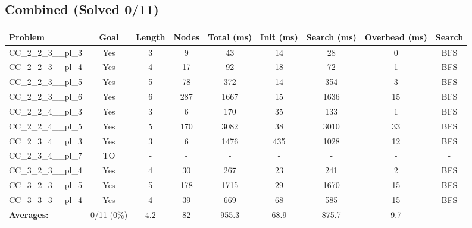 \documentclass{article}
\begin{document}
\subsection*{Combined (Solved 0/11)}
\begin{tabular}{lcccccccc}
\toprule
Problem & Goal & Length & Nodes & Total (ms) & Init (ms) & Search (ms) & Overhead (ms) & Search \\
\midrule
CC\_2\_2\_3\_\_pl\_3 & Yes & 3 & 9 & 43 & 14 & 28 & 0 & BFS \\
CC\_2\_2\_3\_\_pl\_4 & Yes & 4 & 17 & 92 & 18 & 72 & 1 & BFS \\
CC\_2\_2\_3\_\_pl\_5 & Yes & 5 & 78 & 372 & 14 & 354 & 3 & BFS \\
CC\_2\_2\_3\_\_pl\_6 & Yes & 6 & 287 & 1667 & 15 & 1636 & 15 & BFS \\
CC\_2\_2\_4\_\_pl\_3 & Yes & 3 & 6 & 170 & 35 & 133 & 1 & BFS \\
CC\_2\_2\_4\_\_pl\_5 & Yes & 5 & 170 & 3082 & 38 & 3010 & 33 & BFS \\
CC\_2\_3\_4\_\_pl\_3 & Yes & 3 & 6 & 1476 & 435 & 1028 & 12 & BFS \\
CC\_2\_3\_4\_\_pl\_7 & TO & - & - & - & - & - & - & - \\
CC\_3\_2\_3\_\_pl\_4 & Yes & 4 & 30 & 267 & 23 & 241 & 2 & BFS \\
CC\_3\_2\_3\_\_pl\_5 & Yes & 5 & 178 & 1715 & 29 & 1670 & 15 & BFS \\
CC\_3\_3\_3\_\_pl\_4 & Yes & 4 & 39 & 669 & 68 & 585 & 15 & BFS \\
\textbf{Averages:} & 0/11 (0\%) & 4.2 & 82 & 955.3 & 68.9 & 875.7 & 9.7 & \\
\bottomrule
\end{tabular}
\\[0.7cm]
\end{document}

